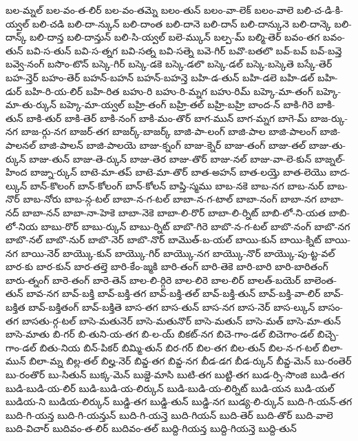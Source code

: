 {బల-మ్నల్
బల-వం-త-లిర్
బల-వం-తమ్నె
బలం-తున్
బలం-వా-లెక్
బలం-వాలె
బలి-చ-డి-కి-య్వల్
బలి-చడి
బలి-దా-న్కున్
బలి-దాంత
బలి-దానె
బలి-దాన్
బలి-దాన్కునె
బలి-దాన్కె
బలి-దాన్క్
బలి-దాన్త
బలి-దాన్తున్
బలి-సి-య్వల్
బలె-మ్కున్
బల్ప-మ్
బల్మి-తెర్
బవం-తగ
బవం-తున్
బవి-స-తున్
బవి-స-త్నగ
బవి-సత్న
బవి-సత్నె
బవె-గిర్
బవొ-బతలొ
బవ్-బవ్
బవ్-బవ్తె
బవ్వె-నంగ్
బసొం-టొన్
బస్కె-గిర్
బస్కె-డకె
బస్కె-డలొ
బస్కె-డల్
బస్కె-బస్కెతె
బస్కే-తెర్
బహ-న్తెర్
బహం-తెర్
బహన్-బహన్
బహన్-బహన్తె
బహి-డ-తున్
బహి-డలె
బహి-డల్
బహి-డుర్
బహి-రి-య-లిర్
బహి-రిత
బహు-రి
బహు-రి-మ్నగ
బహు-రిమ్
బహ్కె-మా-తంగ్
బహ్కె-మా-తు-ర్కున్
బహ్కె-మా-య్వల్
బహ్రి-తంగ్
బహ్రి-తల్
బహ్రి-బహ్రి
బాంద-న్
బాకి-గిరె
బాకి-తున్
బాకి-తుర్
బాకి-తెర్
బాకి-నంగ్
బాకి-మం-తొర్
బాగ-మున్
బాగ-మ్నగ
బాగె-మ్
బాజ-ర్కు-నగ
బాజ-ర్గు-నగ
బాజర్-తగ
బాజర్క్-బాజర్క్
బాజి-పా-లంగ్
బాజి-పాల
బాజి-పాలంగ్
బాజి-పాలనల్
బాజి-పాలన్
బాజి-పాలయె
బాజు-క్నంగ్
బాజు-క్నెర్
బాజు-తంగ్
బాజు-తల్
బాజు-తు-ర్కున్
బాజు-తున్
బాజు-తె-ర్కున్
బాజు-తెర
బాజు-తొర్
బాజు-నల్
బాజు-వా-లె-కున్
బాజ్నల్-హింద
బాజ్ను-ర్కున్
బాటె-మా-తప్
బాటె-మా-తొర్
బాత-అహన్
బాత-లయ్తె
బాత-లెయొ
బాద-ల్కున్
బాన్-కొలంగ్
బాన్-కోలంగ్
బాన్-కోలన్
బాప్తి-స్మము
బాబ-నకె
బాబ-నగ
బాబ-నుర్
బాబ-నొర్
బాబ-నోరు
బాబ-న్గ-టల్
బాబా-న-గ-టల్
బాబా-న-గ-టాల్
బాబా-నంగ్
బాబా-నగ
బాబా-నద్
బాబా-నన్
బాబా-నా-హెకె
బాబా-నెకె
బాబా-లి-రొర్
బాబా-లి-ర్నిట్
బాబి-లో-ని-యత
బాబి-లో-నియ
బాబు-రొర్
బాబు-ర్కున్
బాబు-ర్నిట్
బాబొ-గిరె
బాబొ-న-గ-టల్
బాబొ-నంగ్
బాబొ-నగ
బాబొ-నల్
బాబొ-నుర్
బాబొ-నెర్
బాబొ-నొర్
బామొత్-బ-యల్
బాయి-కున్
బాయి-క్నిట్
బాయి-నగ
బాయి-నెర్
బాయ్కొ-కున్
బాయ్కొ-గిర్
బాయ్కొ-నగ
బాయ్కొ-నొర్
బాయ్కొ-పు-ట్ట-వల్
బార-కు
బార-కున్
బార-తల్తె
బారి-కేం-జ్మకి
బారి-తంగ్
బారి-తెకె
బారి-బారి
బారి-బారితంగ్
బారు-త్నంగ్
బారె-తంగ్
బారె-తెన్
బాల-లి-ర్గిరె
బాల-లిరె
బాల-లిర్
బాలత్-బయెర్
బాలెంత-తున్
బావ-నగ
బావ్-బక్తి
బావ్-బక్తి-తగ
బావ్-బక్తి-తల్
బావ్-బక్తి-తున్
బావ్-బక్తి-వా-లిర్
బావ్-బక్తిత
బావ్-బక్తితంగ్
బావ్-బక్తితె
బాస-తగ
బాస-తున్
బాస-నగ
బాస-నెర్
బాస-ల్కున్
బాసం-తగ
బాసతు-ర్గ-టల్
బాసె-మతునెర్
బాసె-మతునొర్
బాసె-మతున్
బాసె-మత్
బాసె-మా-తున్
బాసె-మాతు
బి-గర్
బి-తుని-య-తగ
బి-ల-య్
బికట్-నగ
బిచె-గాం-డల్
బిచెగాం-డల్
బిచ్చె-గాం-డల్
బితు-నియ
బిన్-పికర్
బిమ్మి-తున్
బిర-గర్
బిల-తగ
బిల-తున్
బిల-న-గ-టల్
బిలా-మున్
బిలా-మ్న
బిల్ల-తల్
బిల్హ-నెర్
బివ్డ-తగ
బివ్డ-నగ
బీడ-డగ
బీడ-ర్కున్
బీవ్డ-మెన్
బు-రంతెర్
బు-రంతొర్
బు-సితున్
బుక్క-మెన్
బుజ్డె-మాసి
బుటి-తగ
బుట్టి-తగ
బుడ-ర్సి-సొంజి
బుడి-తగ
బుడి-బుడి-య-లిర్
బుడి-బుడి-య-లిర్కున్
బుడి-బుడి-య-లిర్నిట్
బుడి-యన
బుడి-యల్
బుడియ-ని
బుడియ-లిర్కున్
బుడ్డి-తగ
బుడ్డి-తున్
బుడ్డి-నగ
బుడ్య-లి-ర్కున్
బుది-గి-యన్-తగ
బుది-గి-యన్త
బుది-గి-యన్తున్
బుది-గి-యన్తె
బుది-గియన్
బుది-తెర్
బుది-తొర్
బుది-వాలె
బుది-విచార్
బుదివం-త-లిర్
బుదివం-తల్
బుద్ది-గియన్త
బుద్ది-గియన్తె
బుద్ది-తున్
}

